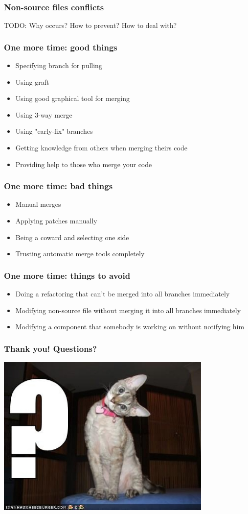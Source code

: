 \documentclass{beamer}
\begin{document}
\begin{frame}
\frametitle{Non-source files conflicts}
TODO: Why occurs? How to prevent? How to deal with? 
\end{frame}


\begin{frame}
\frametitle{One more time: good things}
\begin{itemize}
\item Specifying branch for pulling
\item Using graft
\item Using good graphical tool for merging
\item Using 3-way merge
\item Using "early-fix" branches
\item Getting knowledge from others when merging theirs code
\item Providing help to those who merge your code
\end{itemize}
\end{frame}

\begin{frame}
\frametitle{One more time: bad things}
\begin{itemize}
\item Manual merges
\item Applying patches manually
\item Being a coward and selecting one side
\item Trusting automatic merge tools completely
\end{itemize}
\end{frame}

\begin{frame}
\frametitle{One more time: things to avoid}
\begin{itemize}
\item Doing a refactoring that can't be merged into all branches immediately
\item Modifying non-source file without merging it into all branches immediately
\item Modifying a component that somebody is working on without notifying him 
\end{itemize}
\end{frame}


\begin{frame}
\frametitle{Thank you! Questions?}
\begin{center}
\includegraphics[width=0.8\textwidth]{img/cat}
\end{center}
\end{frame}
\end{document}

